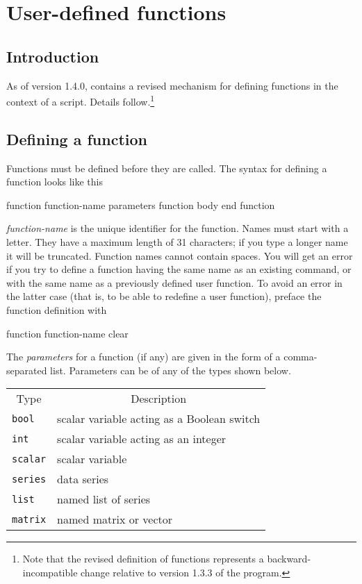\chapter{User-defined functions}
\label{functions}

\section{Introduction}
\label{func-intro}

As of version 1.4.0,  contains a revised mechanism for
defining functions in the context of a script.  Details
follow.\footnote{Note that the revised definition of functions
  represents a backward-incompatible change relative to version 1.3.3
  of the program.}
    
\section{Defining a function}
\label{func-define}

Functions must be defined before they are called.  The syntax for
defining a function looks like this
    
\begin{code}
      function function-name parameters
         function body
      end function
\end{code}

\textsl{function-name} is the unique identifier for the function.
Names must start with a letter. They have a maximum length of 31
characters; if you type a longer name it will be truncated.  Function
names cannot contain spaces.  You will get an error if you try to
define a function having the same name as an existing 
command, or with the same name as a previously defined user function.
To avoid an error in the latter case (that is, to be able to redefine
a user function), preface the function definition with
    
\begin{code}
      function function-name clear
\end{code}

The \textsl{parameters} for a function (if any) are given in the form
of a comma-separated list.  Parameters can be of any of the types
shown below.

\begin{center}
\begin{tabular}{ll}
\multicolumn{1}{c}{Type} & 
\multicolumn{1}{c}{Description} \\ [4pt]
\texttt{bool} & scalar variable acting as a Boolean switch \\
\texttt{int}  & scalar variable acting as an integer  \\
\texttt{scalar} & scalar variable \\
\texttt{series} & data series \\
\texttt{list}   & named list of series \\
\texttt{matrix} & named matrix or vector 
\end{tabular}
\end{center}

